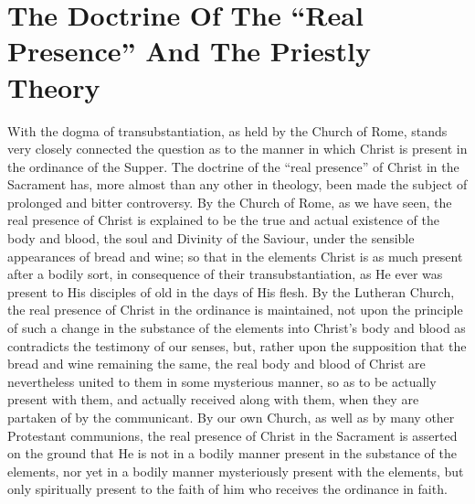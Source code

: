 \documentclass[]{book}
\begin{document}
\hypertarget{the-doctrine-of-the-real-presence-and-the-priestly-theory}{%
\section{The Doctrine Of The ``Real Presence'' And The Priestly Theory}\label{the-doctrine-of-the-real-presence-and-the-priestly-theory}}

With the dogma of transubstantiation, as held by the Church of Rome, stands very closely connected the question as to the manner in which Christ is present in the ordinance of the Supper. The doctrine of the ``real presence'' of Christ in the Sacrament has, more almost than any other in theology, been made the subject of prolonged and bitter controversy. By the Church of Rome, as we have seen, the real presence of Christ is explained to be the true and actual existence of the body and blood, the soul and Divinity of the Saviour, under the sensible appearances of bread and wine; so that in the elements Christ is as much present after a bodily sort, in consequence of their transubstantiation, as He ever was present to His disciples of old in the days of His flesh. By the Lutheran Church, the real presence of Christ in the ordinance is maintained, not upon the principle of such a change in the substance of the elements into Christ's body and blood as contradicts the testimony of our senses, but, rather upon the supposition that the bread and wine remaining the same, the real body and blood of Christ are nevertheless united to them in some mysterious manner, so as to be actually present with them, and actually received along with them, when they are partaken of by the communicant. By our own Church, as well as by many other Protestant communions, the real presence of Christ in the Sacrament is asserted on the ground that He is not in a bodily manner present in the substance of the elements, nor yet in a bodily manner mysteriously present with the elements, but only spiritually present to the faith of him who receives the ordinance in faith.
\end{document}
